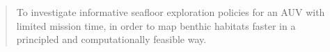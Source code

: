 	\begin{quote}
		To investigate informative seafloor exploration policies for an AUV with limited mission time, in order to map benthic habitats faster in a principled and computationally feasible way.
	\end{quote}
%	
%		
%		
%		
%		
%		
%		
%		
		
